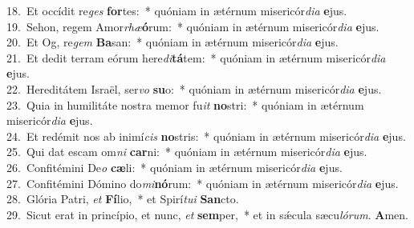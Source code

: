 {18.~}Et occídit re\textit{ges} \textbf{for}tes:~* quóniam in ætérnum misericór\textit{di}\textit{a} \textbf{e}jus.\\
{19.~}Sehon, regem Amor\textit{rhæ}\textbf{ó}rum:~* quóniam in ætérnum misericór\textit{di}\textit{a} \textbf{e}jus.\\
{20.~}Et Og, re\textit{gem} \textbf{Ba}san:~* quóniam in ætérnum misericór\textit{di}\textit{a} \textbf{e}jus.\\
{21.~}Et dedit terram eórum here\textit{di}\textbf{tá}tem:~* quóniam in ætérnum misericór\textit{di}\textit{a} \textbf{e}jus.\\
{22.~}Hereditátem Israël, ser\textit{vo} \textbf{su}o:~* quóniam in ætérnum misericór\textit{di}\textit{a} \textbf{e}jus.\\
{23.~}Quia in humilitáte nostra memor fu\textit{it} \textbf{no}stri:~* quóniam in ætérnum misericór\textit{di}\textit{a} \textbf{e}jus.\\
{24.~}Et redémit nos ab inimí\textit{cis} \textbf{no}stris:~* quóniam in ætérnum misericór\textit{di}\textit{a} \textbf{e}jus.\\
{25.~}Qui dat escam om\textit{ni} \textbf{car}ni:~* quóniam in ætérnum misericór\textit{di}\textit{a} \textbf{e}jus.\\
{26.~}Confitémini De\textit{o} \textbf{cæ}li:~* quóniam in ætérnum misericór\textit{di}\textit{a} \textbf{e}jus.\\
{27.~}Confitémini Dómino do\textit{mi}\textbf{nó}rum:~* quóniam in ætérnum misericór\textit{di}\textit{a} \textbf{e}jus.\\
{28.~}Glória Patri, \textit{et} \textbf{Fí}lio,~* et Spirí\textit{tu}\textit{i} \textbf{San}cto.\\
{29.~}Sicut erat in princípio, et nunc, \textit{et} \textbf{sem}per,~* et in sǽcula sæcu\textit{ló}\textit{rum}. \textbf{A}men.\\
